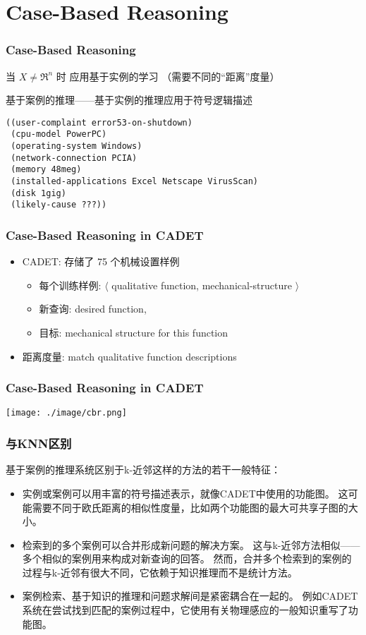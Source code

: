 \documentclass{beamer}
\begin{document}
\section{Case-Based Reasoning}
\label{sec-5}
\begin{frame}[fragile]
\frametitle{Case-Based Reasoning}
\label{sec-5-1}

 当 $X \neq \Re^n$ 时 应用基于实例的学习 （需要不同的“距离”度量）

基于案例的推理——基于实例的推理应用于符号逻辑描述

\begin{verbatim}
((user-complaint error53-on-shutdown)
 (cpu-model PowerPC)
 (operating-system Windows)
 (network-connection PCIA)
 (memory 48meg)
 (installed-applications Excel Netscape VirusScan)
 (disk 1gig)
 (likely-cause ???))
\end{verbatim}
\end{frame}
\begin{frame}
\frametitle{Case-Based Reasoning in CADET}
\label{sec-5-2}


\begin{itemize}
\item CADET: 存储了 75 个机械设置样例
\begin{itemize}
\item 每个训练样例: $\langle$ qualitative function, mechanical-structure $\rangle$
\item 新查询: desired function,
\item 目标: mechanical structure for this function
\end{itemize}
\item 距离度量: match qualitative function descriptions
\end{itemize}
\end{frame}
\begin{frame}
\frametitle{Case-Based Reasoning in CADET}
\label{sec-5-3}

\texttt{[image: ./image/cbr.png]}
\end{frame}
\begin{frame}
\frametitle{与KNN区别}
\label{sec-5-4}

基于案例的推理系统区别于k-近邻这样的方法的若干一般特征：
\begin{itemize}
\item 实例或案例可以用丰富的符号描述表示，就像CADET中使用的功能图。
   这可能需要不同于欧氏距离的相似性度量，比如两个功能图的最大可共享子图的大小。
\item 检索到的多个案例可以合并形成新问题的解决方案。
   这与k-近邻方法相似——多个相似的案例用来构成对新查询的回答。
   然而，合并多个检索到的案例的过程与k-近邻有很大不同，它依赖于知识推理而不是统计方法。
\item 案例检索、基于知识的推理和问题求解间是紧密耦合在一起的。
   例如CADET系统在尝试找到匹配的案例过程中，它使用有关物理感应的一般知识重写了功能图。
\end{itemize}
\end{frame}
\end{document}
